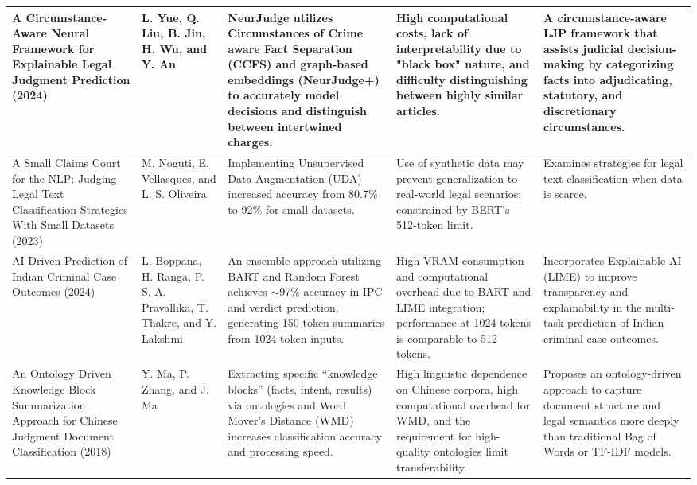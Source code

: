 {\begin{longtable}{|p{}|p{}|>{\raggedright\arraybackslash}p{}|>{\raggedright\arraybackslash}p{}|>{\raggedright\arraybackslash}p{}|}
A Circumstance-Aware Neural Framework for Explainable Legal Judgment Prediction (2024)~\cite{b3} & 
L. Yue, Q. Liu, B. Jin, H. Wu, and Y. An & 
NeurJudge utilizes Circumstances of Crime aware Fact Separation (CCFS) and graph-based embeddings (NeurJudge+) to accurately model decisions and distinguish between intertwined charges. & 
High computational costs, lack of interpretability due to "black box" nature, and difficulty distinguishing between highly similar articles. & 
A circumstance-aware LJP framework that assists judicial decision-making by categorizing facts into adjudicating, statutory, and discretionary circumstances. \\ \hline


A Small Claims Court for the NLP: Judging Legal Text Classification Strategies With Small Datasets (2023)~\cite{b4} & 
M. Noguti, E. Vellasques, and L. S. Oliveira & 
Implementing Unsupervised Data Augmentation (UDA) increased accuracy from 80.7\% to 92\% for small datasets. & 
Use of synthetic data may prevent generalization to real-world legal scenarios; constrained by BERT's 512-token limit. & 
Examines strategies for legal text classification when data is scarce. \\ \hline


AI-Driven Prediction of Indian Criminal Case Outcomes (2024)~\cite{b5} & 
L. Boppana, H. Ranga, P. S. A. Pravallika, T. Thakre, and Y. Lakshmi & 
An ensemble approach utilizing BART and Random Forest achieves $\sim$97\% accuracy in IPC and verdict prediction, generating 150-token summaries from 1024-token inputs. & 
High VRAM consumption and computational overhead due to BART and LIME integration; performance at 1024 tokens is comparable to 512 tokens. & 
Incorporates Explainable AI (LIME) to improve transparency and explainability in the multi-task prediction of Indian criminal case outcomes. \\ \hline


An Ontology Driven Knowledge Block Summarization Approach for Chinese Judgment Document Classification (2018)~\cite{b6} & 
Y. Ma, P. Zhang, and J. Ma & 
Extracting specific ``knowledge blocks'' (facts, intent, results) via ontologies and Word Mover's Distance (WMD) increases classification accuracy and processing speed. & 
High linguistic dependence on Chinese corpora, high computational overhead for WMD, and the requirement for high-quality ontologies limit transferability. & 
Proposes an ontology-driven approach to capture document structure and legal semantics more deeply than traditional Bag of Words or TF-IDF models. \\ \hline


\end{longtable}}
